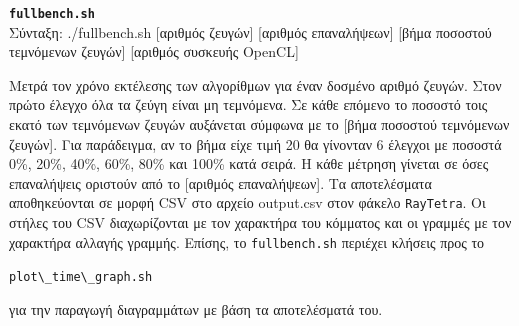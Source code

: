 \noindent\textbf{\verb!fullbench.sh!}\\
Σύνταξη: ./fullbench.sh [αριθμός ζευγών] [αριθμός επαναλήψεων] [βήμα ποσοστού τεμνόμενων ζευγών] [αριθμός συσκευής OpenCL] 
 
\noindent Μετρά τον χρόνο εκτέλεσης των αλγορίθμων για έναν δοσμένο αριθμό ζευγών. Στον πρώτο έλεγχο όλα τα ζεύγη είναι μη τεμνόμενα. Σε κάθε επόμενο το ποσοστό τοις εκατό των τεμνόμενων ζευγών αυξάνεται σύμφωνα με το [βήμα ποσοστού τεμνόμενων ζευγών]. Για παράδειγμα, αν το βήμα είχε τιμή 20 θα γίνονταν 6 έλεγχοι με ποσοστά 0\%, 20\%, 40\%, 60\%, 80\% και 100\% κατά σειρά. Η κάθε μέτρηση γίνεται σε όσες επαναλήψεις οριστούν από το [αριθμός επαναλήψεων]. Τα αποτελέσματα αποθηκεύονται σε μορφή CSV στο αρχείο output.csv στον φάκελο \verb!RayTetra!. Οι στήλες του CSV διαχωρίζονται με τον χαρακτήρα του κόμματος και οι γραμμές με τον χαρακτήρα αλλαγής γραμμής. Επίσης, το \verb!fullbench.sh! περιέχει κλήσεις προς το \begin{english}\verb!plot\_time\_graph.sh!\end{english} για την παραγωγή διαγραμμάτων με βάση τα αποτελέσματά του.   


\UndefineShortVerb{\!}





